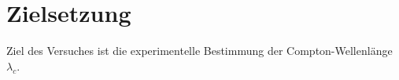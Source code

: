 \section{Zielsetzung}
Ziel des Versuches ist die experimentelle Bestimmung der Compton-Wellenlänge $\lambda_{c}$.